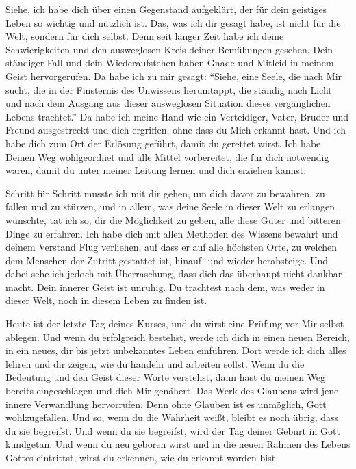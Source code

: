 Siehe, ich habe dich über einen Gegenstand aufgeklärt, der für dein geistiges Leben so wichtig und nützlich ist. Das, was ich dir gesagt habe, ist nicht für die Welt, sondern für dich selbst. Denn seit langer Zeit habe ich deine Schwierigkeiten und den ausweglosen Kreis deiner Bemühungen gesehen. Dein ständiger Fall und dein Wiederaufstehen haben Gnade und Mitleid in meinem Geist hervorgerufen. Da habe ich zu mir gesagt: "`Siehe, eine Seele, die nach Mir sucht, die in der Finsternis des Unwissens herumtappt, die ständig nach Licht und nach dem Ausgang aus dieser ausweglosen Situation dieses vergänglichen Lebens trachtet."' Da habe ich meine Hand wie ein Verteidiger, Vater, Bruder und Freund ausgestreckt und dich ergriffen, ohne dass du Mich erkannt hast. Und ich habe dich zum Ort der Erlösung geführt, damit du gerettet wirst. Ich habe Deinen Weg wohlgeordnet und alle Mittel vorbereitet, die für dich notwendig waren, damit du unter meiner Leitung lernen und dich erziehen kannst. 

Schritt für Schritt musste ich mit dir gehen, um dich davor zu bewahren, zu fallen und zu stürzen, und in allem, was deine Seele in dieser Welt zu erlangen wünschte, tat ich so, dir die Möglichkeit zu geben, alle diese Güter und bitteren Dinge zu erfahren. Ich habe dich mit allen Methoden des Wissens bewahrt und deinem Verstand Flug verliehen, auf dass er auf alle höchsten Orte, zu welchen dem Menschen der Zutritt gestattet ist, hinauf- und wieder herabsteige. Und dabei sehe ich jedoch mit Überraschung, dass dich das überhaupt nicht dankbar macht. Dein innerer Geist ist unruhig. Du trachtest nach dem, was weder in dieser Welt, noch in diesem Leben zu finden ist.

Heute ist der letzte Tag deines Kurses, und du wirst eine Prüfung vor Mir selbst ablegen. Und wenn du erfolgreich bestehst, werde ich dich in einen neuen Bereich, in ein neues, dir bis jetzt unbekanntes Leben einführen. Dort werde ich dich alles lehren und dir zeigen, wie du handeln und arbeiten sollst. Wenn du die Bedeutung und den Geist dieser Worte verstehst, dann hast du meinen Weg bereits eingeschlagen und dich Mir genähert. Das Werk des Glaubens wird jene innere Verwandlung hervorrufen. Denn ohne Glauben ist es unmöglich, Gott wohlzugefallen. Und so, wenn du die Wahrheit weißt, bleibt es noch übrig, dass du sie begreifst. Und wenn du sie begreifst, wird der Tag deiner Geburt in Gott kundgetan. Und wenn du neu geboren wirst und in die neuen Rahmen des Lebens Gottes eintrittst, wirst du erkennen, wie du erkannt worden bist. 


